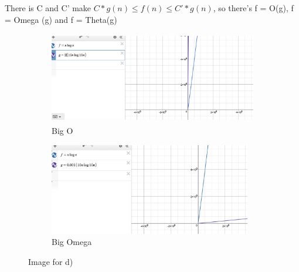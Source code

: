 \documentclass{article}
\begin{document}
\begin{enumerate}[label=(\alph*)]
There is C and C' make $C*g(n) \le f(n) \le C'*g(n)$, so  there's f = O(g), f = Omega (g) and f = Theta(g)\\
    \begin{figure}[h]
    \begin{subfigure}{0.5\textwidth}
    \includegraphics[width=0.9\linewidth, height=4cm]{d) big O.png}
    \caption{Big O}
    \label{fig:subim1}
    \end{subfigure}
    \begin{subfigure}{0.5\textwidth}
    \includegraphics[width=0.9\linewidth, height=4cm]{d) big omega .png}
    \caption{Big Omega}
    \label{fig:subim2}
    \end{subfigure}
    \caption{Image for d)}
    \label{fig:image2}
    \end{figure}


\end{enumerate}
\end{document}
